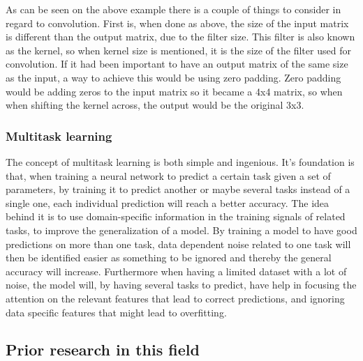 As can be seen on the above example there is a couple of things to consider in regard to convolution. First is, when done as above, the size of the input matrix is different than the output matrix, due to the filter size. This filter is also known as the kernel, so when kernel size is mentioned, it is the size of the filter used for convolution. If it had been important to have an output matrix of the same size as the input, a way to achieve this would be using zero padding. Zero padding would be adding zeros to the input matrix so it became a 4x4 matrix, so when when shifting the kernel across, the output would be the original 3x3.  



\subsubsection{Multitask learning}

The concept of multitask learning is both simple and ingenious. It's foundation is that, when training a neural network to predict a certain task given a set of parameters, by training it to predict another or maybe several tasks instead of a single one, each individual prediction will reach a better accuracy. The idea behind it is to use domain-specific information in the training signals of related tasks, to improve the generalization of a model. By training a model to have good predictions on more than one task, data dependent noise related to one task will then be identified easier as something to be ignored and thereby the general accuracy will increase. Furthermore when having a limited dataset with a lot of noise, the model will, by having several tasks to predict, have help in focusing the attention on the relevant features that lead to correct predictions, and ignoring data specific features that might lead to overfitting. 

\subsection{Prior research in this field}

